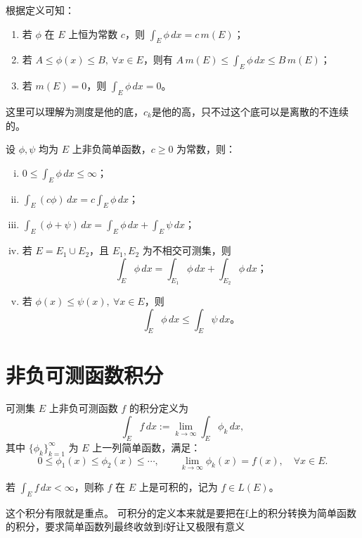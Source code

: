 \documentclass[lang=cn,10pt]{elegantbook}
\begin{document}
\begin{remark}
根据定义可知：
\begin{enumerate}
  \item 若 $\phi$ 在 $E$ 上恒为常数 $c$，则 $\displaystyle \int_E \phi\, dx = c\, m(E)$；
  \item 若 $A \leq \phi(x) \leq B,\ \forall x \in E$，则有 $A\, m(E) \leq \displaystyle \int_E \phi\, dx \leq B\, m(E)$；
  \item 若 $m(E) = 0$，则 $\displaystyle \int_E \phi\, dx = 0$。
\end{enumerate}
\end{remark}
这里可以理解为测度是他的底，$c_k$是他的高，只不过这个底可以是离散的不连续的。
\begin{theorem}
设 $\phi,\psi$ 均为 $E$ 上非负简单函数，$c \geq 0$ 为常数，则：

\begin{enumerate}[(i)]
  \item $0 \leq \displaystyle \int_E \phi\,dx \leq \infty$；
  \item $\displaystyle \int_E (c\phi)\,dx = c \int_E \phi\,dx$；
  \item $\displaystyle \int_E (\phi + \psi)\,dx = \int_E \phi\,dx + \int_E \psi\,dx$；
  \item 若 $E = E_1 \cup E_2$，且 $E_1, E_2$ 为不相交可测集，则
  \[
  \int_E \phi\,dx = \int_{E_1} \phi\,dx + \int_{E_2} \phi\,dx；
  \]
  \item 若 $\phi(x) \leq \psi(x),\ \forall x \in E$，则
  \[
  \int_E \phi\,dx \leq \int_E \psi\,dx。
  \]
\end{enumerate}
\end{theorem}
\section{非负可测函数积分}
\begin{definition}[非负可测函数的积分]\label{def:nonnegative_integral}
可测集 $E$ 上非负可测函数 $f$ 的积分定义为
\[
\int_E f\,dx := \lim_{k \to \infty} \int_E \phi_k\,dx,
\]
其中 $\{\phi_k\}_{k=1}^\infty$ 为 $E$ 上一列简单函数，满足：
\begin{equation}
0 \leq \phi_1(x) \leq \phi_2(x) \leq \cdots, \qquad \lim_{k \to \infty} \phi_k(x) = f(x), \quad \forall x \in E.
\label{eq:approx_simple}
\end{equation}

若 $\int_E f\,dx < \infty$，则称 $f$ 在 $E$ 上是可积的，记为 $f \in L(E)$。
\end{definition}
这个积分有限就是重点。
可积分的定义本来就是要把在f上的积分转换为简单函数的积分，要求简单函数列最终收敛到f好让又极限有意义
\end{document}
